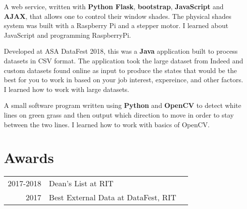 \documentclass[]{deedy-resume-openfont}
\begin{document}
\begin{minipage}[t]{0.66\textwidth}
A web service, written with \textbf{Python Flask}, \textbf{bootstrap}, \textbf{JavaScript} and \textbf{AJAX}, that allows one to control their window shades. The physical shades system was built with a Raspberry Pi and a stepper motor. I learned about JavaScript and programming RaspberryPi.
\sectionsep

\location{}
Developed at ASA DataFest 2018, this was a \textbf{Java} application built to process datasets in CSV format.
The application took the large dataset from Indeed and custom datasets found online as input to produce the states that would be the best for you to work in based on your job interest, expereince, and other factors. I learned how to work with large datasets.
\sectionsep

A small software program written using \textbf{Python} and \textbf{OpenCV} to detect white lines on green grass and then output which direction to move in order to stay between the two lines. I learned how to work with basics of OpenCV.
\sectionsep


\section{Awards}
\begin{tabular}{rll}
2017-2018	   & Dean's List at RIT \\
2017	   & Best External Data at DataFest, RIT \\
\end{tabular}
\sectionsep

\end{minipage}
\end{document}
